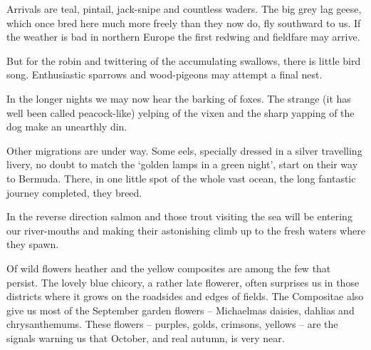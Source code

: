 Arrivals are teal, pintail, jack-snipe and countless waders. The big grey lag geese, which once bred here much more freely than they now do, fly southward to us. If the weather is bad in northern Europe the first redwing and fieldfare may arrive.

But for the robin and twittering of the accumulating swallows, there is little bird song. Enthusiastic sparrows and wood-pigeons may attempt a final nest.

In the longer nights we may now hear the barking of foxes. The strange (it has well been called peacock-like) yelping of the vixen and the sharp yapping of the dog make an unearthly din.

Other migrations are under way. Some eels, specially dressed in a silver travelling livery, no doubt to match the `golden lamps in a green night', start on their way to Bermuda. There, in one little spot of the whole vast ocean, the long fantastic journey completed, they breed.

In the reverse direction salmon and those trout visiting the sea will be entering our river-mouths and making their astonishing climb up to the fresh waters where they spawn.

Of wild flowers heather and the yellow composites are among the few that persist. The lovely blue chicory, a rather late flowerer, often surprises us in those districts where it grows on the roadsides and edges of fields. The Compositae also give us most of the September garden flowers -- Michaelmas daisies, dahlias and chrysanthemums. These flowers -- purples, golds, crimsons, yellows -- are the signals warning us that October, and real autumn, is very near.
